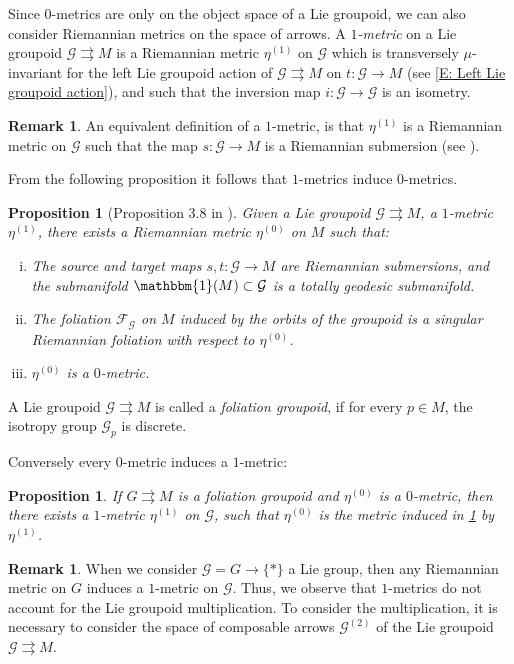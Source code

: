 \documentclass[12pt,a4paper,reqno]{amsart}
\newcommand{\1}{\mathbbm{1}} %
\newcommand{\fol}{\mathcal{F}} %
\newcommand{\G}{\mathcal{G}} %
\newtheorem{proposition}[thm]{Proposition}
\theoremstyle{definition}
\newtheorem{remark}[thm]{Remark}
\theoremstyle{TheoremNum}
\begin{document}
Since $0$-metrics are only on the object space of a Lie groupoid, we can also consider Riemannian metrics on the space of arrows. A \emph{$1$-metric} on a Lie groupoid $\G\rightrightarrows M$ is a Riemannian metric $\eta^{(1)}$ on $\G$ which is transversely $\mu$-invariant for the left Lie groupoid action of $\G\rightrightarrows M$ on $t\colon \G\to M$ (see \th\ref{E: Left Lie groupoid action}), and such that the inversion map $i\colon \G\to \G$ is an isometry. 

\begin{remark}
An equivalent definition of a $1$-metric, is that $\eta^{(1)}$ is a Riemannian metric on $\G$ such that the map $s\colon \G\to M$ is a Riemannian submersion (see \cite[Example 2.9]{delHoyo2013}).
\end{remark}

From the following proposition it follows that $1$-metrics induce $0$-metrics.

\begin{proposition}[Proposition 3.8 in \cite{delHoyoFernandes2018}]\th\label{P: 1-metrics induce 0-metrics}
Given a Lie groupoid $\G\rightrightarrows M$, a $1$-metric $\eta^{(1)}$, there exists a Riemannian metric $\eta^{(0)}$ on $M$ such that:
\begin{enumerate}[(i)]
\item The source and target maps $s,t\colon \G\to M$ are Riemannian submersions, and the submanifold $\1(M)\subset \G$ is a totally geodesic submanifold.
\item The foliation $\fol_{\G}$ on $M$ induced by the orbits of the groupoid is a singular Riemannian foliation with respect to $\eta^{(0)}$.
\item $\eta^{(0)}$ is  a $0$-metric.
\end{enumerate}
\end{proposition}

A Lie groupoid $\G\rightrightarrows M$ is called a \emph{foliation groupoid}, if for every $p\in M$, the  isotropy group $\G_p$ is discrete.

Conversely every $0$-metric induces a $1$-metric:
\begin{proposition}\th\label{P: extension of 0-metrics}
If $G\rightrightarrows M$ is a foliation groupoid and $\eta^{(0)}$ is a $0$-metric, then there exists a $1$-metric $\eta^{(1)}$ on $\G$, such that $\eta^{(0)}$ is  the metric induced in \th\ref{P: 1-metrics induce 0-metrics} by $\eta^{(1)}$.
\end{proposition}


\begin{remark}
When we consider $\G= G\to \{\ast\}$ a Lie group, then any Riemannian metric on $G$ induces a $1$-metric on $\G$. Thus, we observe that $1$-metrics do not account for the Lie groupoid multiplication. To consider the multiplication, it is necessary to consider the space of composable arrows $\G^{(2)}$ of the Lie groupoid $\G\rightrightarrows M$.
\end{remark}
\end{document}
